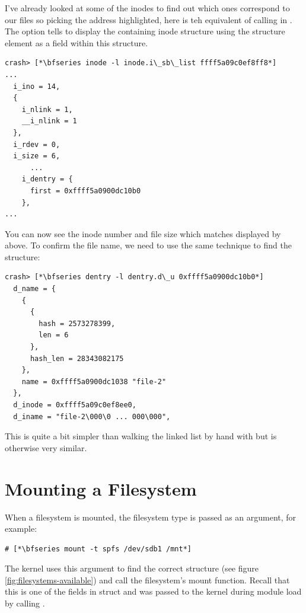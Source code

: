 \noindent
I've already looked at some of the inodes to find out which ones correspond to our files so picking the address highlighted, here is teh equivalent of calling  in . The  option tells  to display the containing inode structure using the structure element  as a field within this structure.

\begin{lstlisting}
crash> [*\bfseries inode -l inode.i\_sb\_list ffff5a09c0ef8ff8*]
...
  i_ino = 14,
  {
    i_nlink = 1,
    __i_nlink = 1
  },
  i_rdev = 0,
  i_size = 6,
      ...
    i_dentry = {
      first = 0xffff5a0900dc10b0
    },
...
\end{lstlisting}

\noindent
You can now see the inode number and file size which matches  displayed by  above. To confirm the file name, we need to use the same technique to find the  structure:

\begin{lstlisting}
crash> [*\bfseries dentry -l dentry.d\_u 0xffff5a0900dc10b0*]
  d_name = {
    {
      {
        hash = 2573278399,
        len = 6
      },
      hash_len = 28343082175
    },
    name = 0xffff5a0900dc1038 "file-2"
  },
  d_inode = 0xffff5a09c0ef8ee0,
  d_iname = "file-2\000\0 ... 000\000",
\end{lstlisting}

\noindent
This is quite a bit simpler than walking the linked list by hand with  but is otherwise very similar.


\section{Mounting a Filesystem}

When a filesystem is mounted, the filesystem type is passed as an argument, for example:

\begin{lstlisting}
# [*\bfseries mount -t spfs /dev/sdb1 /mnt*]
\end{lstlisting}

\noindent
The kernel uses this argument to find the correct  structure (see figure \ref{fig:filesystems-available}) and call the filesystem’s mount function. Recall that this is one of the fields in struct  and was passed to the kernel during module load by calling .

